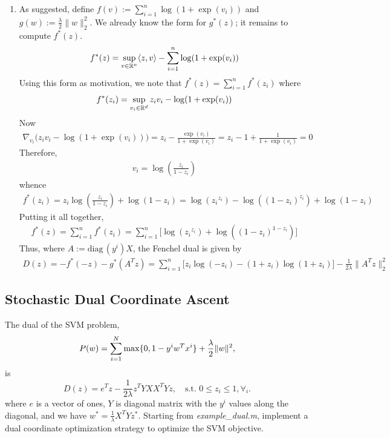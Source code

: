 \documentclass{article}
\begin{document}
\begin{enumerate}
\item As suggested, define $f(v) := \sum_{i=1}^n \log ( 1 + \exp(v_i))$ and
  $g(w) := \frac{\lambda}{2} \|w\|_2^2$. We already know the form for
  $g^*(z)$; it remains to compute $f^*(z)$.
  \begin{align*}
    f^*(z) = \sup_{v \in \mathbb{R}^n} \langle z,v\rangle - \sum_{i=1}^n \log(1 + \exp(v_i))
  \end{align*}
  Using this form as motivation, we note that $f^*(z) = \sum_{i=1}^n f^*(z_i)$
  where
  \begin{align*}
    f^*(z_i) = \sup_{v_i \in \mathbb{R}^d} z_i v_i - \log(1 + \exp(v_i))
  \end{align*}
  Now
  \begin{align*}
    \nabla_{v_i} \big( z_i v_i - \log(1 + \exp(v_i))\big) = z_i -
    \frac{\exp(v_i)}{1 + \exp(v_i)} = z_i - 1 + \frac{1}{1 + \exp(v_i)} = 0 
  \end{align*}
  Therefore,
  \begin{align*}
    v_i = \log(\frac{z_i}{1-z_i})
  \end{align*}
  whence
  \begin{align*}
    f^*(z_i) = z_i \log(\frac{z_i}{1-z_i}) + \log(1-z_i) %
    = \log ( {z_i}^{z_i} ) - \log( (1-z_i)^{z_i}) + \log (1- z_i)
  \end{align*}
  Putting it all together,
  \begin{align*}
    f^*(z) = \sum_{i=1}^n f^*(z_i) = \sum_{i=1}^n \big[ \log ( {z_i}^{z_i} ) +
    \log( (1-z_i)^{1-z_i}) \big]
  \end{align*}
  Thus, where $A := \mathrm{diag}\,(y^i) X$, the Fenchel dual is given by
  \begin{align*}
    D(z) = - f^*(-z) - g^*(A^T z) %
    = \sum_{i=1}^n \big[ z_i \log ( -z_i ) - (1+z_i)\log( 1+z_i) \big] -
    \frac{1}{2\lambda} \| A^T z\|_2^2 
  \end{align*}



\end{enumerate}

\subsection{Stochastic Dual Coordinate Ascent}
The dual of the SVM problem,
\[
P(w) = \sum_{i=1}^N \max\{0,1-y^iw^Tx^i\} + \frac{\lambda}{2}\|w\|^2,
\]
is
\[
D(z) = e^Tz - \frac{1}{2\lambda}z^TYXX^TYz, \quad\text{s.t. } 0 \leq z_i \leq 1, \forall_i.
\]
where $e$ is a vector of ones, $Y$ is diagonal matrix with the $y^i$ values along the diagonal, and we have $w^* = \frac{1}{\lambda}X^TYz^*$. Starting from \emph{example\_dual.m}, implement a dual coordinate optimization  strategy to optimize the SVM objective. 
\end{document}
